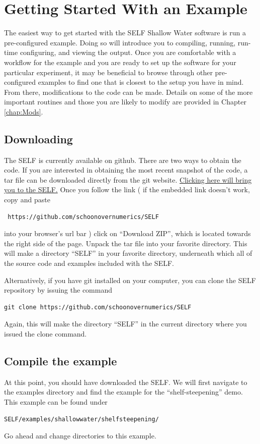 \documentclass{softwaremanual}
\begin{document}
\chapter{Getting Started With an Example}
The easiest way to get started with the SELF Shallow Water software is run a pre-configured example. Doing so will introduce you to compiling, running, run-time configuring, and viewing the output. Once you are comfortable with a workflow for the example and you are ready to set up the software for your particular experiment, it may be beneficial to browse through other pre-configured examples to find one that is closest to the setup you have in mind. From there, modifications to the code can be made. Details on some of the more important routines and those you are likely to modify are provided in Chapter \ref{chap:Mods}.

\section{Downloading}
The SELF is currently available on github. There are two ways to obtain the code. If you are interested in obtaining the most recent snapshot of the code, a tar file can be downloaded directly from the git website.  \href{https://github.com/schoonovernumerics/SELF}{Clicking here will bring you to the SELF.} Once you follow the link ( if the embedded link doesn't work, copy and paste
\begin{verbatim}
 https://github.com/schoonovernumerics/SELF 
\end{verbatim}
into your browser's url bar ) click on ``Download ZIP'', which is located towards the right side of the page. Unpack the tar file into your favorite directory. This will make a directory ``SELF'' in your favorite directory, underneath which all of the source code and examples included with the SELF. 

Alternatively, if you have git installed on your computer, you can clone the SELF repository by issuing the command
\begin{center}
\begin{verbatim}
git clone https://github.com/schoonovernumerics/SELF
\end{verbatim}
\end{center}
Again, this will make the directory ``SELF'' in the current directory where you issued the clone command. 

\section{Compile the example}
At this point, you should have downloaded the SELF. We will first navigate to the examples directory and find the example for the ``shelf-steepening'' demo. This example can be found under
\begin{center}
\begin{verbatim}
SELF/examples/shallowwater/shelfsteepening/
\end{verbatim}
\end{center}
Go ahead and change directories to this example.
\end{document}

